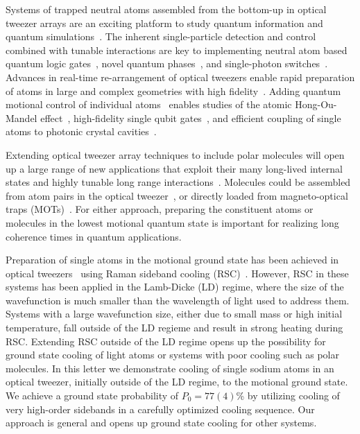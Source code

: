 \documentclass[aps,prl,twocolumn,groupedaddress]{revtex4-1}
\begin{document}
Systems of trapped neutral atoms assembled from the bottom-up in optical tweezer arrays
are an exciting platform to study quantum information and quantum simulations~\cite{Schlosser2001,Weiss2004,Isenhower2010,Wilk2010,Kaufman2015,Labuhn2016,Murmann2015}.
The inherent single-particle detection and control combined with tunable interactions
are key to implementing neutral atom based quantum logic gates~\cite{Isenhower2010,Wilk2010},
novel quantum phases~\cite{Labuhn2016}, and single-photon switches~\cite{Dayan2008,Tiecke2014}.
Advances in real-time re-arrangement of optical tweezers enable rapid preparation of atoms
in large and complex geometries with high fidelity~\cite{Barredo2016,Endres2016}.
Adding quantum motional control of individual
atoms~\cite{Li2012,Kaufman2012,Thompson2013,Liu2017,Robens2017} enables
studies of the atomic Hong-Ou-Mandel effect~\cite{Kaufman2014},
high-fidelity single qubit gates~\cite{Wang2016},
and efficient coupling of single atoms to photonic crystal cavities~\cite{Thompson2013a}.

Extending optical tweezer array techniques to include polar molecules will open up a large range of
new applications that exploit their many long-lived internal states
and highly tunable long range interactions~\cite{DeMille2002,Ni2008,Gorshkov2011,Yan2013}.
Molecules could be assembled from atom pairs in the optical tweezer~\cite{Liu2017},
or directly loaded from magneto-optical traps
(MOTs)~\cite{Barry2014,Truppe2017SubDoppler,Anderegg2017}.
For either approach, preparing the constituent atoms or molecules in the lowest motional
quantum state is important for realizing long coherence times in quantum applications.

Preparation of single atoms in the motional ground state has been achieved in optical tweezers~\cite{Kaufman2012,Thompson2013,Liu2017,Robens2017}
 using Raman sideband cooling (RSC)~\cite{Monroe1995,Kerman2000,Han2000}.
However, RSC in these systems has been applied in the Lamb-Dicke (LD) regime, where
the size of the wavefunction is much smaller than the wavelength of light used to address them.
Systems with a large wavefunction size, either due to small mass or high initial temperature,
fall outside of the LD regieme and result in strong heating during RSC.
Extending RSC outside of the LD regime opens up the possibility
for ground state cooling of light atoms or systems with poor cooling such as polar molecules.
In this letter we demonstrate cooling of single sodium atoms in an optical tweezer,
initially outside of the LD regime, to the motional ground state.
We achieve a ground state probability of $P_0=77(4)$\% by utilizing cooling of
very high-order sidebands in a carefully optimized cooling sequence.
Our approach is general and opens up ground state cooling for other systems.
\end{document}
